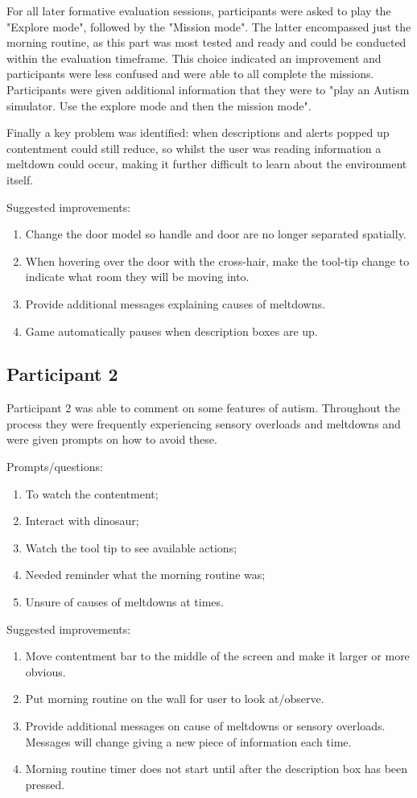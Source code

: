 \documentclass[11pt]{report}
\begin{document}
For all later formative evaluation sessions, participants were asked to play the "Explore mode", followed by the "Mission mode". The latter encompassed just the morning routine, as this part was most tested and ready and could be conducted within the evaluation timeframe. This choice indicated an improvement and participants were less confused and were able to all complete the missions. Participants were given additional information that they were to "play an Autism simulator. Use the explore mode and then the mission mode".

Finally a key problem was identified: when descriptions and alerts popped up contentment could still reduce, so whilst the user was reading information a meltdown could occur, making it further difficult to learn about the environment itself.

Suggested improvements:
\begin{enumerate}
\item Change the door model so handle and door are no longer separated spatially. 
\item When hovering over the door with the cross-hair, make the tool-tip change to indicate what room they will be moving into. 
\item Provide additional messages explaining causes of meltdowns.
\item Game automatically pauses when description boxes are up.
\end{enumerate}

\subsection*{Participant 2} 
Participant 2 was able to comment on some features of autism. Throughout the process they were frequently experiencing sensory overloads and meltdowns and were given prompts on how to avoid these.

Prompts/questions:
\begin{enumerate}
\item To watch the contentment;
\item Interact with dinosaur;
\item Watch the tool tip to see available actions;
\item Needed reminder what the morning routine was;
\item Unsure of causes of meltdowns at times.
\end{enumerate}

Suggested improvements:
\begin{enumerate}
\item Move contentment bar to the middle of the screen and make it larger or more obvious. 
\item Put morning routine on the wall for user to look at/observe. 
\item Provide additional messages on cause of meltdowns or sensory overloads. Messages will change giving a new piece of information each time.
\item Morning routine timer does not start until after the description box has been pressed. 
\end{enumerate}
\end{document}
